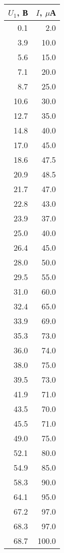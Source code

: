 \begin{tabular}{rr}
\toprule
     $U_1$, В &     $I$, $\mu$А \\
\midrule
   0.1 &    2.0 \\
   3.9 &   10.0 \\
   5.6 &   15.0 \\
   7.1 &   20.0 \\
   8.7 &   25.0 \\
  10.6 &   30.0 \\
  12.7 &   35.0 \\
  14.8 &   40.0 \\
  17.0 &   45.0 \\
  18.6 &   47.5 \\
  20.9 &   48.5 \\
  21.7 &   47.0 \\
  22.8 &   43.0 \\
  23.9 &   37.0 \\
  25.0 &   40.0 \\
  26.4 &   45.0 \\
  28.0 &   50.0 \\
  29.5 &   55.0 \\
  31.0 &   60.0 \\
  32.4 &   65.0 \\
  33.9 &   69.0 \\
  35.3 &   73.0 \\
  36.0 &   74.0 \\
  38.0 &   75.0 \\
  39.5 &   73.0 \\
  41.9 &   71.0 \\
  43.5 &   70.0 \\
  45.5 &   71.0 \\
  49.0 &   75.0 \\
  52.1 &   80.0 \\
  54.9 &   85.0 \\
  58.3 &   90.0 \\
  64.1 &   95.0 \\
  67.2 &   97.0 \\
  68.3 &   97.0 \\
  68.7 &  100.0 \\
\bottomrule
\end{tabular}